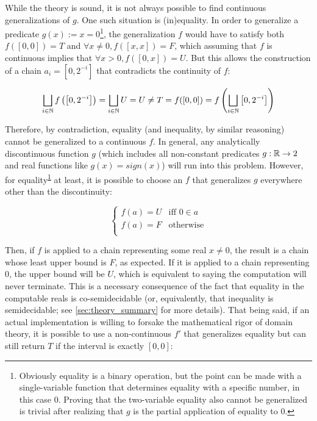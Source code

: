 While the theory is sound, it is not always possible to find continuous generalizations of $g$. One such situation is (in)equality. In order to generalize a predicate $g(x) := x = 0$\footnote{\label{ftnt:equality}Obviously equality is a binary operation, but the point can be made with a single-variable function that determines equality with a specific number, in this case $0$. Proving that the two-variable equality also cannot be generalized is trivial after realizing that $g$ is the partial application of equality to $0$.}, the generalization $f$ would have to satisfy both $f([0,0]) = T$ and $\forall x \neq 0, f([x,x]) = F$, which assuming that $f$ is continuous implies that $\forall x > 0, f([0,x]) = U$. But this allows the construction of a chain $a_i = \left[0, 2^{-i}\right]$ that contradicts the continuity of $f$:

\begin{equation*}
  \bigsqcup_{\substack{i \in \mathbb{N}}} f \left(\left[0, 2^{-i}\right]\right) = \bigsqcup_{\substack{i \in \mathbb{N}}} U = U \neq T = f([0,0]) = f \left(\bigsqcup_{\substack{i \in \mathbb{N}}} \left[0, 2^{-i}\right]\right)
\end{equation*}

Therefore, by contradiction, equality (and inequality, by similar reasoning) cannot be generalized to a continuous $f$. In general, any analytically discontinuous function $g$ (which includes all non-constant predicates $g : \mathbb{R} \rightarrow 2$ and real functions like $g(x) = sign(x)$) will run into this problem. However, for equality\textsuperscript{\ref{ftnt:equality}} at least, it is possible to choose an $f$ that generalizes $g$ everywhere other than the discontinuity:

\begin{equation}
\label{eq:cont_equality}
  \begin{cases}
    f(a) = U & \text{iff } 0 \in a \\
    f(a) = F & \text{otherwise} \\
  \end{cases}
\end{equation}

Then, if $f$ is applied to a chain representing some real $x \neq 0$, the result is a chain whose least upper bound is $F$, as expected. If it is applied to a chain representing $0$, the upper bound will be $U$, which is equivalent to saying the computation will never terminate. This is a necessary consequence of the fact that equality in the computable reals is co-semidecidable (or, equivalently, that inequality is semidecidable; see \cref{sec:theory_summary} for more details). That being said, if an actual implementation is willing to forsake the mathematical rigor of domain theory, it is possible to use a non-continuous $f'$ that generalizes equality but can still return $T$ if the interval is exactly $[0, 0]$:

